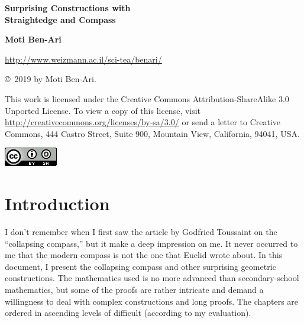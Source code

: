 
\thispagestyle{empty}

\begin{center}
\textbf{\LARGE Surprising Constructions with\\\bigskip Straightedge and Compass}

\bigskip
\bigskip
\bigskip
\bigskip

\textbf{\Large Moti Ben-Ari}

\bigskip
\bigskip

\url{http://www.weizmann.ac.il/sci-tea/benari/}
\end{center}



\vfill

\begin{footnotesize}
\begin{center}
\copyright{}\ 2019 by Moti Ben-Ari.
\end{center}

This work is licensed under the Creative Commons Attribution-ShareAlike 3.0 Unported License. To view a copy of this license, visit \url{http://creativecommons.org/licenses/by-sa/3.0/} or send a letter to Creative Commons, 444 Castro Street, Suite 900, Mountain View, California, 94041, USA.
\end{footnotesize}

\bigskip

\begin{center}
\includegraphics[width=.15\textwidth]{../../by-sa.png}
\end{center}

\np
\thispagestyle{empty}
\mbox{}
\np
\thispagestyle{empty}

\tableofcontents
\np
\mbox{}
\np

\chapter*{Introduction}

I don't remember when I first saw the article by Godfried Toussaint \cite{toussaint} on the ``collapsing compass,'' but it make a deep impression on me. It never occurred to me that the modern compass is not the one that Euclid wrote about. In this document, I present the collapsing compass and other surprising geometric constructions. The mathematics used is no more advanced than secondary-school mathematics, but some of the proofs are rather intricate and demand a willingness to deal with complex constructions and long proofs. The chapters are ordered in ascending levels of difficult (according to my evaluation).

